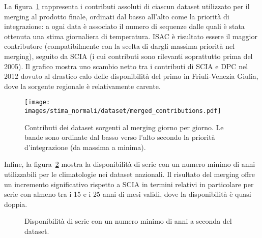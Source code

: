 La figura~\ref{fig:merged-contributions} rappresenta i contributi assoluti di ciascun dataset utilizzato per il merging al prodotto finale, ordinati dal basso all'alto come la priorità di integrazione: a ogni data è associato il numero di sequenze dalle quali è stata ottenuta una stima giornaliera di temperatura. ISAC è risultato essere il maggior contributore (compatibilmente con la scelta di dargli massima priorità nel merging), seguito da SCIA (i cui contributi sono rilevanti soprattutto prima del 2005). Il grafico mostra uno scambio netto tra i contributi di SCIA e DPC nel 2012 dovuto al drastico calo delle disponibilità del primo in Friuli-Venezia Giulia, dove la sorgente regionale è relativamente carente.
\begin{figure}[ht]
  \centering
  \texttt{[image: images/stima\_normali/dataset/merged\_contributions.pdf]}
  \caption{Contributi dei dataset sorgenti al merging giorno per giorno. Le bande sono ordinate dal basso verso l'alto secondo la priorità d'integrazione (da massima a minima).}\label{fig:merged-contributions}
\end{figure}

Infine, la figura~\ref{fig:merged-improvements} mostra la disponibilità di serie con un numero minimo di anni utilizzabili per le climatologie nei dataset nazionali. Il risultato del merging offre un incremento significativo rispetto a SCIA in termini relativi in particolare per serie con almeno tra i 15 e i 25 anni di mesi validi, dove la disponibilità è quasi doppia.
\begin{figure}[ht]
  \centering
  
  \caption{Disponibilità di serie con un numero minimo di anni a seconda del dataset.}\label{fig:merged-improvements}
\end{figure}
